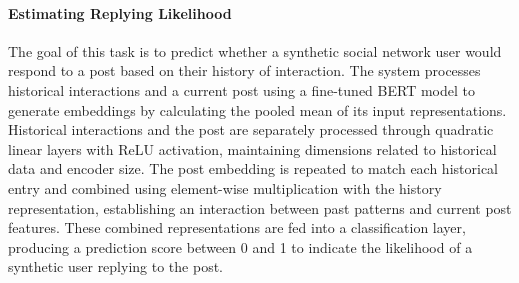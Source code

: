 \paragraph{Estimating Replying Likelihood}
The goal of this task is to predict whether a synthetic social network user would respond to a post based on their history of interaction. The system processes historical interactions and a current post using a fine-tuned BERT model \cite{zhang2023twhin} to generate embeddings by calculating the pooled mean of its input representations. Historical interactions and the post are separately processed through quadratic linear layers with ReLU activation, maintaining dimensions related to historical data and encoder size. The post embedding is repeated to match each historical entry and combined using element-wise multiplication with the history representation, establishing an interaction between past patterns and current post features. These combined representations are fed into a classification layer, producing a prediction score between 0 and 1 to indicate the likelihood of a synthetic user replying to the post.
